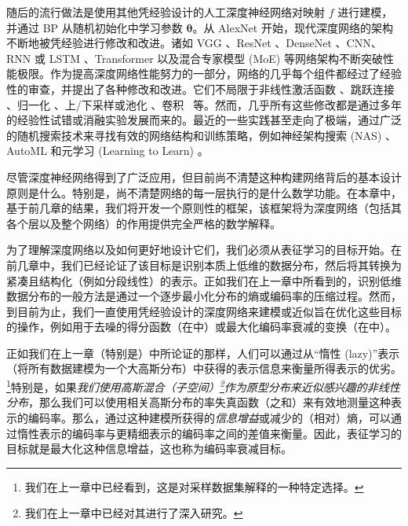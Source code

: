 \documentclass[../../book-main_zh.tex]{subfiles}
\begin{document}
随后的流行做法是使用其他凭经验设计的人工深度神经网络对映射 $f$ 进行建模，并通过 BP 从随机初始化中学习参数 $\bm \theta$。从 AlexNet \cite{krizhevsky2012imagenet} 开始，现代深度网络的架构不断地被凭经验进行修改和改进。诸如 VGG \cite{simonyan2014very}、ResNet \cite{he2016deep}、DenseNet \cite{dense-net}、CNN、RNN 或 LSTM \cite{LSTM}、Transformer \cite{vaswani2017attention} 以及混合专家模型 (MoE) \cite{MoE,Fedus-2022} 等网络架构不断突破性能极限。作为提高深度网络性能努力的一部分，网络的几乎每个组件都经过了经验性的审查，并提出了各种修改和改进。它们不局限于非线性激活函数 \cite{maas2013rectifier,klambauer2017self,xu2015empirical,nwankpa2018activation}、跳跃连接 \cite{ronneberger2015u,he2016deep}、归一化 \cite{ioffe2015batch,ba2016layer,ulyanov2016instance,wu2018group,miyato2018spectral}、上/下采样或池化 \cite{scherer2010evaluation}、卷积~\cite{lecun1998gradient,krizhevsky2012imagenet} 等。然而，几乎所有这些修改都是通过多年的经验性{试错}或消融实验发展而来的。最近的一些实践甚至走向了极端，通过广泛的随机搜索技术来寻找有效的网络结构和训练策略，例如神经架构搜索 (NAS) \cite{NAS-1,Baker2017DesigningNN}、AutoML \cite{automl} 和元学习 (Learning to Learn) \cite{andrychowicz2016learning}。

尽管深度神经网络得到了广泛应用，但目前尚不清楚这种构建网络背后的基本设计原则是什么。特别是，尚不清楚网络的每一层执行的是什么数学功能。在本章中，基于前几章的结果，我们将开发一个原则性的框架，该框架将为深度网络（包括其各个层以及整个网络）的作用提供完全严格的数学解释。

为了理解深度网络以及如何更好地设计它们，我们必须从表征学习的目标开始。在前几章中，我们已经论证了该目标是识别本质上低维的数据分布，然后将其转换为紧凑且结构化（例如分段线性）的表示。正如我们在上一章中所看到的，识别低维数据分布的一般方法是通过一个逐步最小化分布的熵或编码率的压缩过程。然而，到目前为止，我们一直使用凭经验设计的深度网络来建模或近似旨在优化这些目标的操作，例如用于去噪的得分函数（在中）或最大化编码率衰减的变换（在中）。

正如我们在上一章（特别是）中所论证的那样，人们可以通过从“惰性 (lazy)”表示（将所有数据建模为一个大高斯分布）中获得的表示信息来衡量所得表示的优劣。\footnote{我们在上一章中已经看到，这是对采样数据集解释的一种特定选择。}特别是，如果\textit{我们使用高斯混合（子空间）\footnote{我们在上一章中已经对其进行了深入研究。}作为原型分布来近似感兴趣的非线性分布}，那么我们可以使用相关高斯分布的率失真函数（之和）来有效地测量这种表示的编码率。那么，通过这种建模所获得的{\em 信息增益}或减少的（相对）熵，可以通过惰性表示的编码率与更精细表示的编码率之间的差值来衡量。因此，表征学习的目标就是最大化这种信息增益，这也称为编码率衰减目标。
\end{document}
